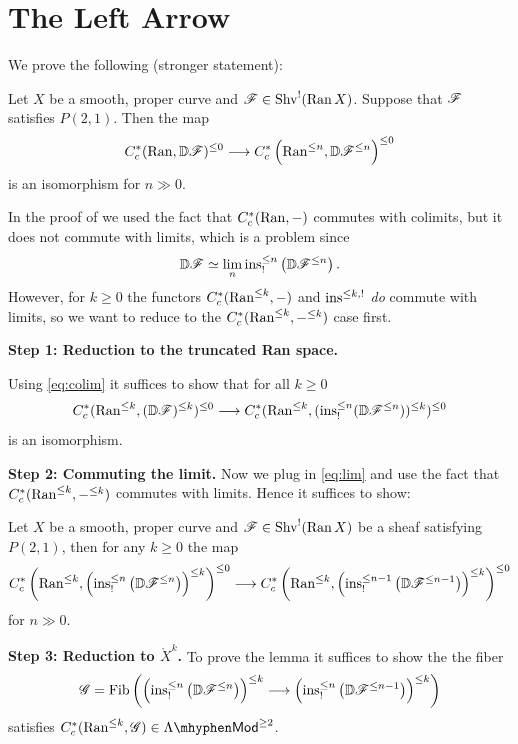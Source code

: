 \documentclass[oneside]{amsart}
\begin{document}
\section{The Left Arrow}
We prove the following (stronger statement):
\begin{proposition}\label{prop:dualti}
	Let $X$ be a smooth, proper curve and $\mathscr{F}\in \operatorname{Shv}^{!}(\operatorname{Ran} X)$. Suppose that $\mathscr{F}$ satisfies $P(2,1)$. Then the map
	\[
	C^{*}_c(\Ran, \VD\CF)^{\le 0} \to C^{*}_c \left( \Ran^{\le n}, \VD \CF^{\le n} \right) ^{\le 0}
	\] 
	is an isomorphism for $n\gg 0$.
\end{proposition}
In the proof of  we used the fact that $C^{*}_c(\operatorname{Ran},-)$ commutes with colimits, but it does not commute with limits, which is a problem since
\begin{equation}\label{eq:lim}
\mathbb{D}\mathscr{F} \simeq \lim_n \operatorname{ins}^{\le n}_! \left( \mathbb{D} \mathscr{F}^{\le n} \right) .
\end{equation} 
However, for $k\ge 0$ the functors $C^{*}_c(\operatorname{Ran}^{\le k},-)$ and $\operatorname{ins}^{\le k,!}$ \emph{do} commute with limits, so we want to reduce to the $C^{*}_c(\operatorname{Ran}^{\le k},-^{\le k})$ case first.

\textbf{Step 1: Reduction to the truncated Ran space.}

Using \eqref{eq:colim} it suffices to show that for all $k\ge 0$ 
\[
C^{*}_c(\Ran^{\le k},(\VD\CF)^{\le k})^{\le 0} \to C^{*}_c(\Ran^{\le k},(\ins^{\le n}_!(\VD\CF^{\le n}))^{\le k})^{\le 0}
\] 
is an isomorphism.

\textbf{Step 2: Commuting the limit.}
Now we plug in \eqref{eq:lim} and use the fact that $C^{*}_c(\operatorname{Ran}^{\le k},-^{\le k})$ commutes with limits. Hence it suffices to show:
\begin{lemma}
	Let $X$ be a smooth, proper curve and $\mathscr{F}\in \operatorname{Shv}^{!}(\operatorname{Ran} X)$ be a sheaf satisfying $P(2,1)$, then for any $k\ge 0$ the map
	\[
		C^{*}_c \left( \Ran^{\le k}, \left( \ins^{\le n}_! \left( \VD\CF^{\le n} \right) \right) ^{\le k} \right) ^{\le 0} \to C^{*}_c \left( \Ran^{\le k}, \left( \ins^{\le n-1}_! \left( \VD\CF^{\le n-1} \right) \right) ^{\le k} \right) ^{\le 0} 
	\] 
	for $n\gg 0$.
\end{lemma}

\textbf{Step 3: Reduction to $\mathring{X}^{k}$.}
To prove the lemma it suffices to show the the fiber
\[
\CG = \Fib \left( \left( \ins^{\le n}_! \left( \VD\CF^{\le n} \right)  \right) ^{\le k} \to  \left( \ins^{\le n}_! \left( \VD\CF^{\le n-1} \right)  \right) ^{\le k}\right)
\] 
satisfies $C^{*}_c(\Ran^{\le k},\CG)\in \lMod^{\ge 2}$.
\end{document}
